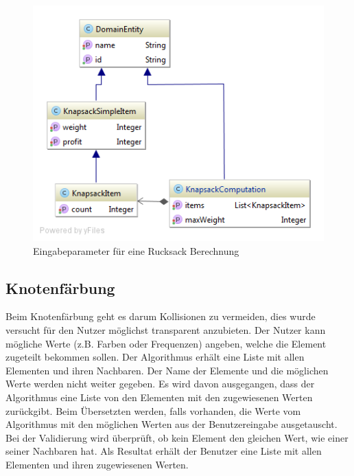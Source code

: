 \begin{figure}[h]
\centering
\includegraphics[scale=0.5]{images/probleme/knapsack.png}
\caption[Eingabeparameter für eine Rucksack Berechnung]{Eingabeparameter für eine Rucksack Berechnung \selfmade{}}
\label{fig:knapsack_input}
\end{figure}

\FloatBarrier

%
%
%
%

\subsection{Knotenfärbung}
Beim Knotenfärbung geht es darum Kollisionen zu vermeiden, dies wurde versucht für den Nutzer möglichst transparent anzubieten. Der Nutzer kann mögliche Werte (z.B. Farben oder 
Frequenzen) angeben, welche die Element zugeteilt bekommen sollen. Der Algorithmus erhält eine Liste mit allen Elementen und ihren Nachbaren. Der Name der Elemente und die möglichen 
Werte werden nicht weiter gegeben. Es wird davon ausgegangen, dass der Algorithmus eine Liste von den Elementen mit den zugewiesenen Werten zurückgibt. Beim Übersetzten werden, falls 
vorhanden, die Werte vom Algorithmus mit den möglichen Werten aus der Benutzereingabe ausgetauscht. Bei der Validierung wird überprüft, ob kein Element den gleichen Wert, wie einer 
seiner Nachbaren hat. Als Resultat erhält der Benutzer eine Liste mit allen Elementen und ihren zugewiesenen Werten.

